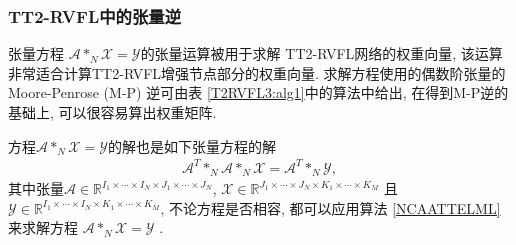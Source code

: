 \subsubsection{TT2-RVFL中的张量逆} \label{Trapezoidsection5-1}
张量方程 $\mathcal A *_N \mathcal X = \mathcal Y$的张量运算被用于求解 TT2-RVFL网络的权重向量,  该运算非常适合计算TT2-RVFL增强节点部分的权重向量.
求解方程使用的偶数阶张量的 Moore-Penrose (M-P) 逆可由表 \ref{T2RVFL3:alg1}中的算法中给出, 在得到M-P逆的基础上, 可以很容易算出权重矩阵.
\begin{remark}
    方程$\mathcal A *_N \mathcal X = \mathcal Y$的解也是如下张量方程的解
\begin{align}
    \mathcal A^T *_N\mathcal  A *_N \mathcal X = \mathcal A^T *_N \mathcal Y,
\end{align}
其中张量$\mathcal A \in \mathbb R^{I_1\times \cdots\times I_N\times J_1\times \cdots\times J_N} $, $\mathcal X \in \mathbb R^{J_1\times \cdots\times J_N\times K_1\times \cdots\times K_M} $
且 $\mathcal Y \in \mathbb R^{I_1\times \cdots\times I_N\times K_1\times \cdots\times K_M}$,
不论方程是否相容, 都可以应用算法 \ref{NCAATTELML} 来求解方程 $\mathcal  A *_N \mathcal X = \mathcal Y$ \cite{HuangZhao2019-9577}.
\end{remark}
